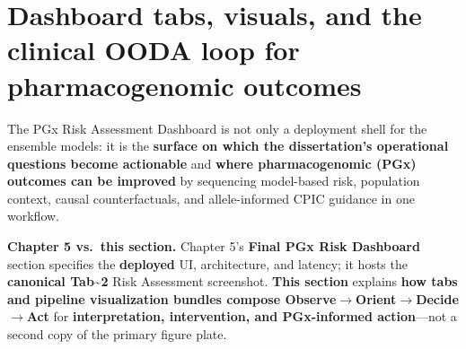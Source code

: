 \documentclass[
  12pt,
]{book}
\begin{document}
\section{Dashboard tabs, visuals, and the clinical OODA loop for
pharmacogenomic outcomes}\label{sec-ch6-dashboard}

The PGx Risk Assessment Dashboard is not only a deployment shell for the
ensemble models: it is the \textbf{surface on which the dissertation's
operational questions become actionable} and \textbf{where
pharmacogenomic (PGx) outcomes can be improved} by sequencing
model-based risk, population context, causal counterfactuals, and
allele-informed CPIC guidance in one workflow.

\textbf{Chapter 5 vs.~this section.} Chapter 5's \textbf{Final PGx Risk
Dashboard} section specifies the \textbf{deployed} UI, architecture, and
latency; it hosts the \textbf{canonical Tab\textasciitilde2} Risk
Assessment screenshot. \textbf{This section} explains \textbf{how tabs
and pipeline visualization bundles compose
Observe\(\rightarrow\)Orient\(\rightarrow\)Decide\(\rightarrow\)Act} for
\textbf{interpretation, intervention, and PGx-informed action}---not a
second copy of the primary figure plate.
\end{document}
